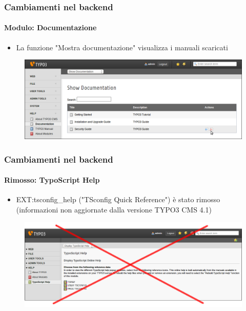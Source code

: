 \begin{frame}[fragile]
	\frametitle{Cambiamenti nel backend}
	\framesubtitle{Modulo: Documentazione}

	\begin{itemize}
		\item La funzione "Mostra documentazione" visualizza i manuali scaricati
	\end{itemize}

	\begin{figure}
		\includegraphics[width=0.95\linewidth]{Images/BackendChanges/ShowDocumentation.png}
	\end{figure}

\end{frame}


\begin{frame}[fragile]
	\frametitle{Cambiamenti nel backend}
	\framesubtitle{Rimosso: TypoScript Help}

 	\begin{itemize}
		\item EXT:tsconfig\_help ("TSconfig Quick Reference") è stato rimosso\newline
			\small(informazioni non aggiornate dalla versione TYPO3 CMS 4.1)
	\end{itemize}

	\begin{figure}
		\includegraphics[width=0.95\linewidth]{Images/BackendChanges/TypoScriptHelpRemovedCrossed.png}
	\end{figure}

\end{frame}


